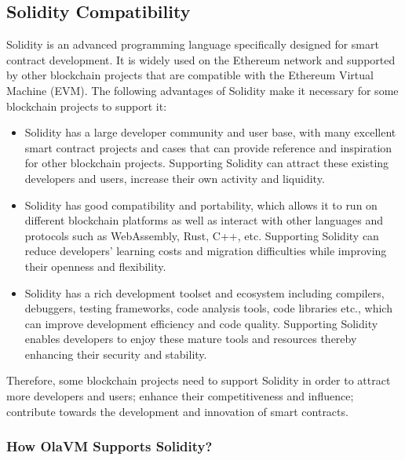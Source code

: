 \subsection{Solidity Compatibility}\label{section: solidity-compatibility}

Solidity is an advanced programming language specifically designed for smart contract development. It is widely used on the Ethereum network and supported by other blockchain projects that are compatible with the Ethereum Virtual Machine (EVM). The following advantages of Solidity make it necessary for some blockchain projects to support it:

\begin{itemize}
    \item Solidity has a large developer community and user base, with many excellent smart contract projects and cases that can provide reference and inspiration for other blockchain projects. Supporting Solidity can attract these existing developers and users, increase their own activity and liquidity.
    \item Solidity has good compatibility and portability, which allows it to run on different blockchain platforms as well as interact with other languages and protocols such as WebAssembly, Rust, C++, etc. Supporting Solidity can reduce developers' learning costs and migration difficulties while improving their openness and flexibility.
    \item Solidity has a rich development toolset and ecosystem including compilers, debuggers, testing frameworks, code analysis tools, code libraries etc., which can improve development efficiency and code quality. Supporting Solidity enables developers to enjoy these mature tools and resources thereby enhancing their security and stability.
\end{itemize}

Therefore, some blockchain projects need to support Solidity in order to attract more developers and users; enhance their competitiveness and influence; contribute towards the development and innovation of smart contracts.


\subsubsection{How OlaVM Supports Solidity?}

